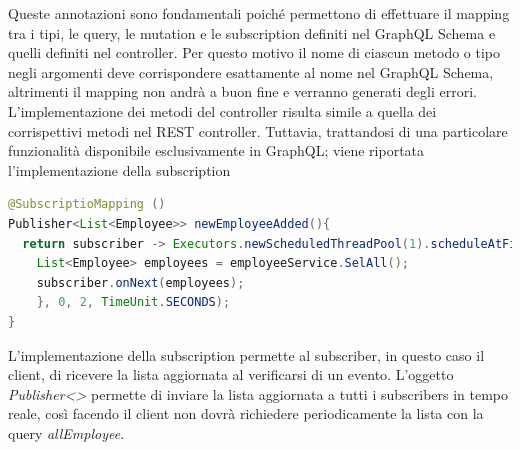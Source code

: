 Queste annotazioni sono fondamentali poiché permettono di effettuare il mapping tra i tipi, le query, le mutation e le subscription definiti nel GraphQL Schema e quelli definiti nel controller. Per questo motivo il nome di ciascun metodo o tipo negli argomenti deve corrispondere esattamente al nome nel GraphQL Schema, altrimenti il mapping non andrà a buon fine e verranno generati degli errori.\\
L'implementazione dei metodi del controller risulta simile a quella dei corrispettivi metodi nel REST controller. Tuttavia, trattandosi di una particolare funzionalità disponibile esclusivamente in GraphQL; viene riportata l'implementazione della subscription \begin{lstlisting}[language=Java, title={newEmployeeAdded()} morecomment={[s][\color{DarkOrchid}]{@}{\ }},  morecomment={[s][\color{OliveGreen}]{"}{"}},]
@SubscriptioMapping ()
Publisher<List<Employee>> newEmployeeAdded(){
  return subscriber -> Executors.newScheduledThreadPool(1).scheduleAtFixedRate(() -> {
    List<Employee> employees = employeeService.SelAll();
    subscriber.onNext(employees);
    }, 0, 2, TimeUnit.SECONDS);
}
\end{lstlisting}
L'implementazione della subscription permette al subscriber, in questo caso il client, di ricevere la lista aggiornata al verificarsi di un evento. L'oggetto \textit{Publisher<>} permette di inviare la lista aggiornata a tutti i subscribers in tempo reale, così facendo il client non dovrà richiedere periodicamente la lista con la query \textit{allEmployee}.
